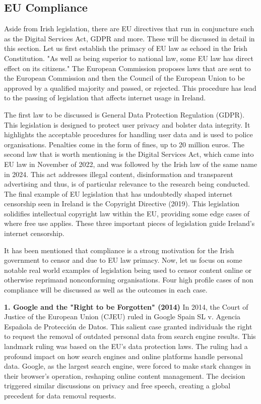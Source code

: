 \subsection{EU Compliance}
Aside from Irish legislation, there are EU directives that run in conjuncture such as the Digital Services Act, GDPR and more. These will be discussed in detail in this section. Let us first establish the primacy of EU law as echoed in the Irish Constitution. "As well as being superior to national law, some EU law has direct effect on its citizens." \cite{citizensinformation2025} The European Commission proposes laws that are sent to the European Commission and then the Council of the European Union to be approved by a qualified majority and passed, or rejected. \cite{europa2025} This procedure has lead to the passing of legislation that affects internet usage in Ireland. 

The first law to be discussed is General Data Protection Regulation (GDPR). This legislation is designed to protect user privacy and bolster data integrity. It highlights the acceptable procedures for handling user data and is used to police organisations. Penalties come in the form of fines, up to 20 million euros. \cite{gdprinfo2025} 
The second law that is worth mentioning is the Digital Services Act, which came into EU law in November of 2022, and was followed by the Irish law of the same name in 2024. \cite{enterprisegovie2025} \cite{irishstatutebook2024} This act addresses illegal content, disinformation and transparent advertising and thus, is of particular relevance to the research being conducted. 
The final example of EU legislation that has undoubtedly shaped internet censorship seen in Ireland is the Copyright Directive (2019). This legislation solidifies intellectual copyright law within the EU, providing some edge cases of where free use applies. \cite{EUCopyright} These three important pieces of legislation guide Ireland's internet censorship. 

It has been mentioned that compliance is a strong motivation for the Irish government to censor and due to EU law primacy. Now, let us focus on some notable real world examples of legislation being used to censor content online or otherwise reprimand nonconforming organisations. Four high profile cases of non compliance will be discussed as well as the outcomes in each case. 

\textbf{1. Google and the "Right to be Forgotten" (2014)}
In 2014, the Court of Justice of the European Union (CJEU) ruled in Google Spain SL v. Agencia Española de Protección de Datos. This salient case granted individuals the right to request the removal of outdated personal data from search engine results. \cite{google2014} This landmark ruling was based on the EU's data protection laws. The ruling had a profound impact on how search engines and online platforms handle personal data. Google, as the largest search engine, were forced to make stark changes in their browser's operation, reshaping online content management. The decision triggered similar discussions on privacy and free speech, creating a global precedent for data removal requests.

